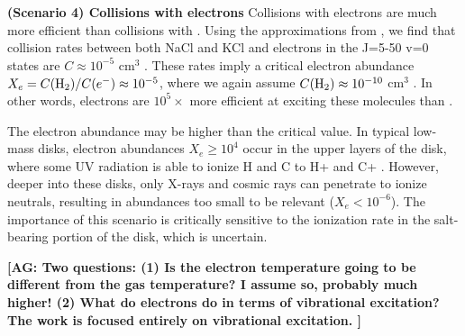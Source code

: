 \documentclass[twocolumn]{aastex62}
\newcommand{\bam}[1]{\textcolor{green!65!black}{\textbf{[BAM: #1]}}}
\newcommand{\ag}[1]{\textcolor{red!65!black}{\textbf{[AG: #1]}}}
\begin{document}
\textbf{(Scenario 4) Collisions with electrons}
Collisions with electrons are much more efficient than collisions with \hh.
Using the approximations from \citet{Dickinson1975a}, we find that collision
rates between both NaCl and KCl and electrons in the J=5-50 v=0 states are
$C\approx10^{-5}$ cm$^{3}$ \pers.  These rates imply a critical electron
abundance $X_e = C(\textrm{H}_{2})/C(e^-) \approx 10^{-5}$, where we again assume
$C(\textrm{H}_{2})\approx10^{-10}$ cm$^3$ \pers.  In other words, electrons are
$10^5\times$ more efficient at exciting these molecules than \hh.

The electron abundance may be higher than the critical value.
In typical low-mass disks, electron abundances $X_e \geq 10^4$ 
occur in the upper layers of the disk, where some UV radiation
is able to ionize H and C to H+ and C+ \citep{Bergin2007a}.
However, deeper into these disks, only X-rays and cosmic rays
can penetrate to ionize neutrals, resulting in abundances too
small to be relevant ($X_e < 10^{-6}$).  
The importance of this scenario is critically sensitive to the ionization rate
in the salt-bearing portion of the disk, which is uncertain.

\ag{Two questions:
(1) Is the electron temperature going to be different from the
gas temperature?  I assume so, probably much higher!
(2) What do electrons do in terms of vibrational excitation?
The \citet{Dickinson1975a} work is focused entirely on vibrational
excitation.
}



%

\end{document}
